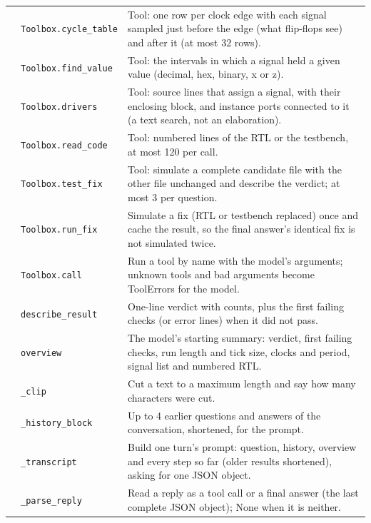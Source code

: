 \begin{longtable}{@{}p{2.8cm}>{\raggedright\arraybackslash}p{4.6cm}p{7.9cm}@{}}
{\small } & \texttt{\small Toolbox.\allowbreak cycle\_\allowbreak{}table} & Tool: one row per clock edge with each signal sampled just before the edge (what flip-flops see) and after it (at most 32 rows). \\
{\small } & \texttt{\small Toolbox.\allowbreak find\_\allowbreak{}value} & Tool: the intervals in which a signal held a given value (decimal, hex, binary, x or z). \\
{\small } & \texttt{\small Toolbox.\allowbreak drivers} & Tool: source lines that assign a signal, with their enclosing block, and instance ports connected to it (a text search, not an elaboration). \\
{\small } & \texttt{\small Toolbox.\allowbreak read\_\allowbreak{}code} & Tool: numbered lines of the RTL or the testbench, at most 120 per call. \\
{\small } & \texttt{\small Toolbox.\allowbreak test\_\allowbreak{}fix} & Tool: simulate a complete candidate file with the other file unchanged and describe the verdict; at most 3 per question. \\
{\small } & \texttt{\small Toolbox.\allowbreak run\_\allowbreak{}fix} & Simulate a fix (RTL or testbench replaced) once and cache the result, so the final answer's identical fix is not simulated twice. \\
{\small } & \texttt{\small Toolbox.\allowbreak call} & Run a tool by name with the model's arguments; unknown tools and bad arguments become ToolErrors for the model. \\
{\small } & \texttt{\small describe\_\allowbreak{}result} & One-line verdict with counts, plus the first failing checks (or error lines) when it did not pass. \\
{\small } & \texttt{\small overview} & The model's starting summary: verdict, first failing checks, run length and tick size, clocks and period, signal list and numbered RTL. \\
{\small } & \texttt{\small \_\allowbreak{}clip} & Cut a text to a maximum length and say how many characters were cut. \\
{\small } & \texttt{\small \_\allowbreak{}history\_\allowbreak{}block} & Up to 4 earlier questions and answers of the conversation, shortened, for the prompt. \\
{\small } & \texttt{\small \_\allowbreak{}transcript} & Build one turn's prompt: question, history, overview and every step so far (older results shortened), asking for one JSON object. \\
{\small } & \texttt{\small \_\allowbreak{}parse\_\allowbreak{}reply} & Read a reply as a tool call or a final answer (the last complete JSON object); None when it is neither. \\

\end{longtable}
